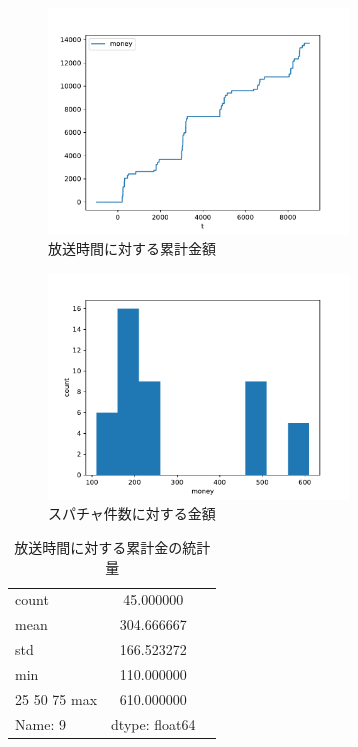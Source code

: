 \documentclass[uplatex,twocolumn]{jsarticle}
\begin{document}
\begin{figure}[H]
\includegraphics[width=8cm,clip]{livechatlog.pdf}
\caption{放送時間に対する累計金額}\label{time}
\end{figure}

\begin{figure}[H]
\includegraphics[width=8cm,clip]{livechatlog_hist.pdf}
\caption{スパチャ件数に対する金額}\label{hist}
\end{figure}

\begin{table}[hbtp]
\caption{放送時間に対する累計金の統計量}
\label{table:data_type}
\centering
\begin{tabular}{lcr}
\hline
count & 45.000000 \\
mean & 304.666667 \\
std & 166.523272 \\
min & 110.000000 \\
25%
50%
75%
max & 610.000000 \\
Name: 9 & dtype: float64 \\
\hline
\end{tabular}
\end{table}
\end{document}
